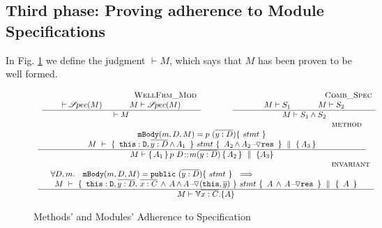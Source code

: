 \subsection{Third phase: Proving adherence to Module Specifications}
\label{sect:wf}

In Fig. \ref{f:wf} we  define the judgment $\vdash M$, which says that  
$M$ has been proven to be well formed. 
 

\begin{figure}[thb]
$
\begin{array}{l}
\begin{array}{lcl}
\inferruleSDNarrow 
{~ \strut  {\sc{WellFrm\_Mod}}}
{  \vdash \SpecOf {M}
  \hspace{1.2cm}  M \vdash \SpecOf {M}
}
{
\vdash M  
}
& \hspace{0.7cm} &
\inferruleSDNarrow 
{~ \strut   {\sc{Comb\_Spec}}}
{  
M \vdash S_1 \hspace{1.2cm}  M \vdash S_2
}
{
M \vdash S_1 \wedge S_2
}
\end{array}
\\
\inferruleSD 
{~ \strut \hspace{6.5cm} {\sc{method}}}
{  
 \prg{mBody}(m,D,M)=p \ (\overline{y:D})\{\  stmt \ \}       
    \\
  {\hprovesN{M} { \ \prg{this}:\prg{D}, \overline{y:D}\, {\wedge\, A_1}\  } %
  {\ stmt\ } {\ A_2\, \sdN{\wedge\, \PushASLong {\prg{res}} {A_2}} \ }   {A_3} } 
}
{
M \vdash {\mprepostN {A_1}{p\ D}{m}{y}{D}{A_2} {A_3} }
}
\\
\inferruleSD 
{~ \strut \hspace{6.5cm} {\sc{invariant}}}
{
\begin{array}{l}
\forall  D,  m. \ \ \  \prg{mBody}(m,D,M)=\prg{public} \ (\overline{y:D})\{\  stmt \ \}      \ \ \Longrightarrow  
  \\
 \begin{array}{l}
   \hprovesN {M}  
{ \ \prg{this}:\prg{D}, \overline{y:D},\,   \overline{x:C} \, \wedge\,  A \, \sdN{\wedge\, \PushASLong {(\prg{this},\overline y)} {A}}\, }  
  	{\ stmt\ }   
	 {\  A\, \wedge\, \PushASLong {\prg{res}} {A} \ }  
{\ A \ }  
 \end{array}
 \end{array}
}
{
M \vdash \TwoStatesN{ \overline{x:C}} {A}
}
\end{array}
$
\caption{Methods' and Modules' Adherence to Specification}
\label{f:wf}
\end{figure}

